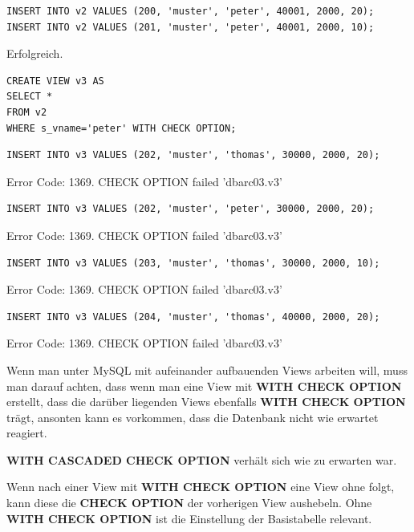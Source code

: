 \documentclass[10pt]{scrreprt}
\newcommand{\Bold}[1]{\textbf{#1}} %
\begin{document}
\begin{lstlisting}[style=sql]
INSERT INTO v2 VALUES (200, 'muster', 'peter', 40001, 2000, 20);
INSERT INTO v2 VALUES (201, 'muster', 'peter', 40001, 2000, 10);
\end{lstlisting}
Erfolgreich.

\begin{lstlisting}[style=sql]
CREATE VIEW v3 AS
SELECT *
FROM v2
WHERE s_vname='peter' WITH CHECK OPTION;
\end{lstlisting}

\begin{lstlisting}[style=sql]
INSERT INTO v3 VALUES (202, 'muster', 'thomas', 30000, 2000, 20);
\end{lstlisting}
Error Code: 1369. CHECK OPTION failed 'dbarc03.v3'

\begin{lstlisting}[style=sql]
INSERT INTO v3 VALUES (202, 'muster', 'peter', 30000, 2000, 20);
\end{lstlisting}
Error Code: 1369. CHECK OPTION failed 'dbarc03.v3'

\begin{lstlisting}[style=sql]
INSERT INTO v3 VALUES (203, 'muster', 'thomas', 30000, 2000, 10);
\end{lstlisting}
Error Code: 1369. CHECK OPTION failed 'dbarc03.v3'

\begin{lstlisting}[style=sql]
INSERT INTO v3 VALUES (204, 'muster', 'thomas', 40000, 2000, 20);
\end{lstlisting}
Error Code: 1369. CHECK OPTION failed 'dbarc03.v3'\newline\newline

Wenn man unter MySQL mit aufeinander aufbauenden Views arbeiten will, muss man darauf achten, dass wenn man eine View mit \Bold{WITH CHECK OPTION} erstellt, dass die darüber liegenden Views ebenfalls \Bold{WITH CHECK OPTION} trägt, ansonten kann es vorkommen, dass die Datenbank nicht wie erwartet reagiert.\newline\newline

\Bold{WITH CASCADED CHECK OPTION} verhält sich wie zu erwarten war.\newline\newline

Wenn nach einer View mit \Bold{WITH CHECK OPTION} eine View ohne folgt, kann diese die \Bold{CHECK OPTION} der vorherigen View aushebeln. Ohne \Bold{WITH CHECK OPTION} ist die Einstellung der Basistabelle relevant.
\end{document}
